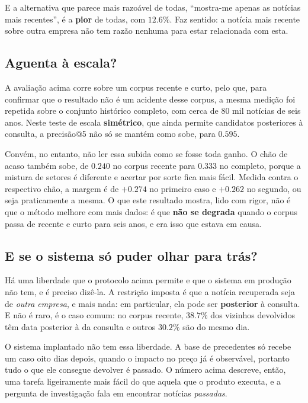 E a alternativa que parece mais razoável de todas, ``mostra-me apenas as notícias mais
recentes'', é a \textbf{pior} de todas, com $12.6\%$. Faz sentido: a notícia mais recente sobre
outra empresa não tem razão nenhuma para estar relacionada com esta.

\subsection{Aguenta à escala?}

A avaliação acima corre sobre um corpus recente e curto, pelo que, para confirmar que o resultado
não é um acidente desse corpus, a mesma medição foi repetida sobre o conjunto histórico completo,
com cerca de 80 mil notícias de seis anos. Neste teste de escala \textbf{simétrico}, que ainda
permite candidatos posteriores à consulta, a precisão@5 não só se mantém como sobe, para
$\mathbf{0.595}$.

Convém, no entanto, não ler essa subida como se fosse toda ganho. O chão de acaso também sobe, de
$0.240$ no corpus recente para $0.333$ no completo, porque a mistura de setores é diferente e
acertar por sorte fica mais fácil. Medida contra o respectivo chão, a margem é de $+0.274$ no
primeiro caso e $+0.262$ no segundo, ou seja praticamente a mesma. O que este resultado mostra,
lido com rigor, não é que o método melhore com mais dados: é que \textbf{não se degrada} quando o
corpus passa de recente e curto para seis anos, e era isso que estava em causa.

\subsection{E se o sistema só puder olhar para trás?}
\label{sec:av_qi2_causal}

Há uma liberdade que o protocolo acima permite e que o sistema em produção não tem, e é preciso
dizê-la. A restrição imposta é que a notícia recuperada seja de \emph{outra empresa}, e mais
nada: em particular, ela pode ser \textbf{posterior} à consulta. E não é raro, é o caso comum:
no corpus recente, $38.7\%$ dos vizinhos devolvidos têm data posterior à da consulta e outros
$30.2\%$ são do mesmo dia.

O sistema implantado não tem essa liberdade. A base de precedentes só recebe um caso oito dias
depois, quando o impacto no preço já é observável, portanto tudo o que ele consegue devolver é
passado. O número acima descreve, então, uma tarefa ligeiramente mais fácil do que aquela que o
produto executa, e a pergunta de investigação fala em encontrar notícias \emph{passadas}.


